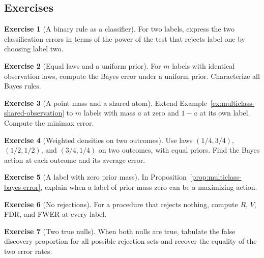 \documentclass[11pt,oneside]{book}
\theoremstyle{definition}
\newtheorem{exercise}{Exercise}[section]
\theoremstyle{remark}
\begin{document}
\subsection{Exercises}
\label{subsec:exercises-6-4}

\begin{exercise}[A binary rule as a classifier]
\label{exer:multiple-binary-classification}
For two labels, express the two classification errors in terms of the power of the test that rejects label one by choosing label two.
\end{exercise}

\begin{exercise}[Equal laws and a uniform prior]
\label{exer:multiple-equal-laws}
For $m$ labels with identical observation laws, compute the Bayes error under a uniform prior. Characterize all Bayes rules.
\end{exercise}

\begin{exercise}[A point mass and a shared atom]
\label{exer:multiple-shared-atom}
Extend Example~\ref{ex:multiclass-shared-observation} to $m$ labels with mass $a$ at zero and $1-a$ at its own label. Compute the minimax error.
\end{exercise}

\begin{exercise}[Weighted densities on two outcomes]
\label{exer:multiple-weighted-densities}
Use laws $(1/4,3/4)$, $(1/2,1/2)$, and $(3/4,1/4)$ on two outcomes, with equal priors. Find the Bayes action at each outcome and its average error.
\end{exercise}

\begin{exercise}[A label with zero prior mass]
\label{exer:multiple-zero-prior}
In Proposition~\ref{prop:multiclass-bayes-error}, explain when a label of prior mass zero can be a maximizing action.
\end{exercise}

\begin{exercise}[No rejections]
\label{exer:multiple-no-rejections}
For a procedure that rejects nothing, compute $R$, $V$, FDR, and FWER at every label.
\end{exercise}

\begin{exercise}[Two true nulls]
\label{exer:multiple-global-null}
When both nulls are true, tabulate the false discovery proportion for all possible rejection sets and recover the equality of the two error rates.
\end{exercise}
\end{document}
